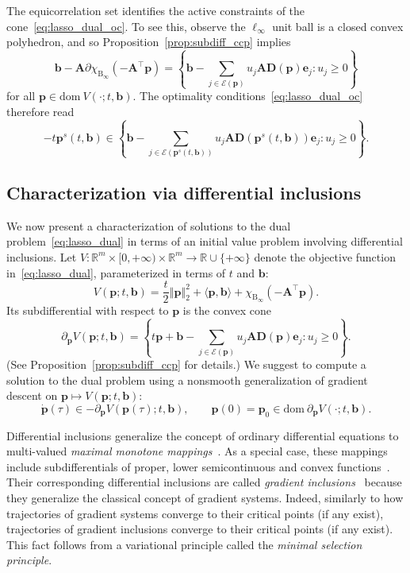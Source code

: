 \documentclass[11pt]{article}
\numberwithin{prop}{section}
\numberwithin{lem}{section}
\numberwithin{rem}{section}
\numberwithin{cor}{section}
\numberwithin{thm}{section}
\numberwithin{defn}{section}
\numberwithin{fact}{section}
\theoremstyle{plain}
\def\bb {\boldsymbol{b}}
\def\be {\boldsymbol{e}}
\def\bp {\boldsymbol{p}}
\def\R {\mathbb{R}}
\newcommand{\normsq}[1]{\left\Vert{#1} \right\Vert_{2}^{2}}
\newcommand{\matr}[1]{\bm{#1}}
\def\dom {\mathrm{dom~}}    %
\def\Binf {\mathrm{B}_{\infty}}
\def\Rm {\R^m}
\def\bpsol {\bp^{s}}
\def\ep {\mathcal{E}(\bp)}
\def\Atop {\matr{A}^{\top}}
\begin{document}
The equicorrelation set identifies the active constraints of the cone~\eqref{eq:lasso_dual_oc}. To see this, observe the $\ell_{\infty}$ unit ball is a closed convex polyhedron, and so Proposition~\eqref{prop:subdiff_ccp} implies
\[
\bb - \matr{A}\partial\chi_{\Binf}(-\matr{A}^{\top}\bp) = \left\{\bb - \sum_{j \in \ep} u_{j} \matr{A}\matr{D}(\bp)\be_{j} : u_{j} \geqslant 0\right\}
\]
for all $\bp \in \dom V(\cdot;t,\bb)$. The optimality conditions~\eqref{eq:lasso_dual_oc} therefore read
\begin{equation}\label{eq:bpdn_full_oc}
-t\bpsol(t,\bb) \in \left\{\bb - \sum_{j \in \mathcal{E}(\bpsol(t,\bb))} u_{j} \matr{A}\matr{D}(\bpsol(t,\bb))\be_{j} : u_{j} \geqslant 0\right\}.
\end{equation}


\subsection{Characterization via differential inclusions}\label{differential inclusions}
We now present a characterization of solutions to the dual problem~\eqref{eq:lasso_dual} in terms of an initial value problem involving differential inclusions. Let $V \colon \Rm \times [0,+\infty) \times \Rm \to \R \cup \{+\infty\}$ denote the objective function in~\eqref{eq:lasso_dual}, parameterized in terms of $t$ and $\bb$:
\begin{equation}\label{eq:BPDN_potential}
    V(\bp;t,\bb) = \frac{t}{2}\normsq{\bp} + \langle\bp,\bb\rangle + \chi_{\Binf}(-\Atop\bp).
\end{equation}
Its subdifferential with respect to $\bp$ is the convex cone 
\begin{equation}\label{eq:BPDN_subdiff_potential}
    \partial_{\bp} V(\bp;t,\bb) = \left\{t\bp + \bb - \sum_{j \in \mathcal{E}(\bp)} u_{j} \matr{A}\matr{D}(\bp)\be_{j} : u_{j} \geqslant 0\right\}.
\end{equation}
(See Proposition~\ref{prop:subdiff_ccp} for details.) We suggest to compute a solution to the dual problem using a nonsmooth generalization of gradient descent on $\bp \mapsto V(\bp;t,\bb)$:
\begin{equation}\label{eq:V_diff_inclusion}
    \dot{\bp}(\tau) \in - \partial_{\bp} V(\bp(\tau);t,\bb), \qquad \bp(0) = \bp_{0} \in \dom \partial_{\bp} V(\cdot; t,\bb).
\end{equation}

Differential inclusions generalize the concept of ordinary differential equations to multi-valued \emph{maximal monotone mappings}~\cite{aubin2012differential,brezis1973ope}. As a special case, these mappings include subdifferentials of proper, lower semicontinuous and convex functions~\cite[Theorem 12.17]{rockafellar2009variational}. Their corresponding differential inclusions are called \emph{gradient inclusions}~\cite{broer2010handbook} because they generalize the classical concept of gradient systems. Indeed, similarly to how trajectories of gradient systems converge to their critical points (if any exist), trajectories of gradient inclusions converge to their critical points (if any exist). This fact follows from a variational principle called the \emph{minimal selection principle}.
\end{document}
